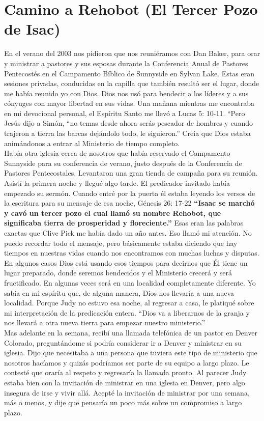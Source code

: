 \documentclass[twoside, 12pt]{book}
\begin{document}
\section{Camino a Rehobot (El Tercer Pozo de Isac)}

En el verano del 2003 nos pidieron que nos reuniéramos con Dan Baker, para orar y ministrar a pastores y sus esposas durante la Conferencia Anual de Pastores Pentecostés en el Campamento Bíblico de Sunnyside en Sylvan Lake. Estas eran sesiones privadas, conducidas en la capilla que también resultó ser el lugar, donde me había reunido yo con Dios. Dios nos usó para bendecir a los líderes y a sus cónyuges con mayor libertad en sus vidas. Una mañana mientras me encontraba en mi devocional personal, el Espíritu Santo me llevó a Lucas 5: 10-11. “Pero Jesús dijo a Simón, “no temas desde ahora serás pescador de hombres y cuando trajeron a tierra las barcas dejándolo todo, le siguieron.” Creía que Dios estaba animándonos a entrar al Ministerio de tiempo completo.\\

Había otra iglesia cerca de nosotros que había reservado el Campamento Sunnyside para su conferencia de verano, justo después de la Conferencia de Pastores Pentecostales. Levantaron una gran tienda de campaña para su reunión. Asistí la primera noche y llegué algo tarde. El predicador invitado había empezado su sermón. Cuando entré por la puerta él estaba leyendo los versos de la escritura para su mensaje de esa noche, Génesis 26: 17-22 \textbf{“Isaac se marchó y cavó un tercer pozo el cual llamó su nombre Rehobot, que significaba tierra de prosperidad y floreciente.”} Esas eran las palabras exactas que Clive Pick me había dado un año antes. Eso llamó mi atención. No puedo recordar todo el mensaje, pero básicamente estaba diciendo que hay tiempos en nuestras vidas cuando nos encontramos con muchas luchas y disputas. En algunos casos Dios está usando esos tiempos para decirnos que Él tiene un lugar preparado, donde seremos bendecidos y el Ministerio crecerá y será fructificado. En algunas veces será en una localidad completamente diferente. Yo sabía en mi espíritu que, de alguna manera, Dios nos llevaría a una nueva localidad. Porque Judy no estuvo esa noche, al regresar a casa, le platiqué sobre mi interpretación de la predicación entera. “Dios va a liberarnos de la granja y nos llevará a otra nueva tierra para empezar nuestro ministerio.”\\

Mas adelante en la semana, recibí una llamada telefónica de un pastor en Denver Colorado, preguntándome si podría considerar ir a Denver y ministrar en su iglesia. Dijo que necesitaba a una persona que tuviera este tipo de ministerio que nosotros hacíamos y quizás podríamos ser parte de su equipo a largo plazo. Le contesté que oraría al respeto y regresaría la llamada pronto. Al parecer Judy estaba bien con la invitación de ministrar en una iglesia en Denver, pero algo insegura de irse y vivir allá. Acepté la invitación de ministrar por una semana, más o menos, y dije que pensaría un poco más sobre un compromiso a largo plazo.\\
\end{document}
